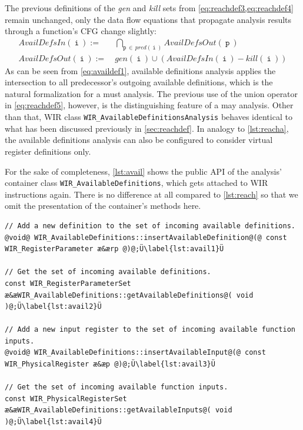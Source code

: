 The previous definitions of the \textit{gen} and \textit{kill} sets from \cref{eq:reachdef3,eq:reachdef4} remain unchanged, only the data flow equations that propagate analysis results through a function's \gls{CFG} change slightly:
\begin{align}
  \textit{AvailDefsIn}(\ \texttt{i}\ ) :=\ & \bigcap\limits_{\texttt{p}\,\in\,\textit{pred}(\ \texttt{i}\ )} \textit{AvailDefsOut}(\ \texttt{p}\ )\label{eq:availdef1} \\
  \textit{AvailDefsOut}(\ \texttt{i}\ ) :=\ & \textit{gen}(\ \texttt{i}\ ) \cup (\textit{AvailDefsIn}(\ \texttt{i}\ ) - \textit{kill}(\ \texttt{i}\ ))\label{eq:availdef2}
\end{align}
As can be seen from \cref{eq:availdef1}, available definitions analysis applies the intersection to all predecessor's outgoing available definitions, which is the natural formalization for a must analysis.
The previous use of the union operator in \cref{eq:reachdef5}, however, is the distinguishing feature of a may analysis.
Other than that, \gls{WIR} class \texttt{WIR\_AvailableDefinitionsAnalysis} behaves identical to what has been discussed previously in \cref{sec:reachdef}.
In analogy to \cref{lst:reacha}, the available definitions analysis can also be configured to consider virtual register definitions only.

For the sake of completeness, \cref{lst:avail} shows the public \gls{API} of the analysis' container class \texttt{WIR\_Avail\-able\-Definitions}, which gets attached to \gls{WIR} instructions again.
There is no difference at all compared to \cref{lst:reach} so that we omit the presentation of the container's methods here.

\begin{lstlisting}[style=code,float=ht,caption={Available Definitions and Inputs Handling of Container Class \texttt{WIR\_AvailableDefinitions}},label=lst:avail]
// Add a new definition to the set of incoming available definitions.
@void@ WIR_AvailableDefinitions::insertAvailableDefinition@(@ const WIR_RegisterParameter æ&ærp @)@;Ü\label{lst:avail1}Ü

// Get the set of incoming available definitions.
const WIR_RegisterParameterSet æ&æWIR_AvailableDefinitions::getAvailableDefinitions@( void )@;Ü\label{lst:avail2}Ü

// Add a new input register to the set of incoming available function inputs.
@void@ WIR_AvailableDefinitions::insertAvailableInput@(@ const WIR_PhysicalRegister æ&æp @)@;Ü\label{lst:avail3}Ü

// Get the set of incoming available function inputs.
const WIR_PhysicalRegisterSet æ&æWIR_AvailableDefinitions::getAvailableInputs@( void )@;Ü\label{lst:avail4}Ü
\end{lstlisting}


